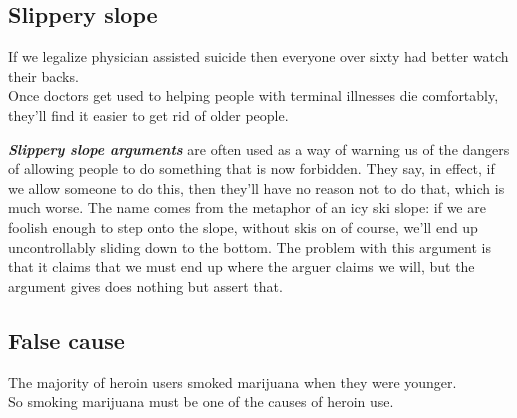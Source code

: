 \documentclass[
  12pt, openany]{book}
\begin{document}
\hypertarget{slippery-slope}{%
\subsection*{Slippery slope}\label{slippery-slope}}


\begin{center}

\begin{argument}

If we legalize physician assisted suicide then everyone over sixty had better watch their backs.\\

Once doctors get used to helping people with terminal illnesses die comfortably, they'll find it easier to get rid of older people.

\end{argument}

\end{center}

\textbf{\emph{Slippery slope arguments}} are often used as a way of warning us of the dangers of allowing people to do something that is now forbidden. They say, in effect, if we allow someone to do this, then they'll have no reason not to do that, which is much worse. The name comes from the metaphor of an icy ski slope: if we are foolish enough to step onto the slope, without skis on of course, we'll end up uncontrollably sliding down to the bottom. The problem with this argument is that it claims that we must end up where the arguer claims we will, but the argument gives does nothing but assert that.

\hypertarget{false-cause}{%
\subsection*{False cause}\label{false-cause}}


\begin{center}

\begin{argument}

The majority of heroin users smoked marijuana when they were younger.\\
So smoking marijuana must be one of the causes of heroin use.

\end{argument}

\end{center}
\end{document}
